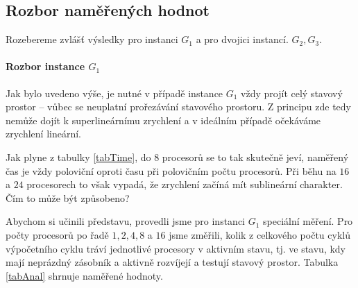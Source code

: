 \documentclass[12pt]{article}
\theoremstyle{definition}
\begin{document}
\subsection{Rozbor naměřených hodnot}
Rozebereme zvlášť výsledky pro instanci $G_1$ a pro dvojici instancí. $G_2, G_3$.
\paragraph{Rozbor instance $G_1$}\mbox{}\newline
Jak bylo uvedeno výše, je nutné v případě instance $G_1$ vždy projít celý stavový prostor -- vůbec se
neuplatní prořezávání stavového prostoru. Z principu zde tedy nemůže dojít k superlineárnímu zrychlení a v ideálním
případě očekáváme zrychlení lineární.

Jak plyne z tabulky \ref{tabTime}, do $8$ procesorů se to tak skutečně jeví, naměřený čas je vždy poloviční oproti času
při polovičním počtu procesorů. Při běhu na $16$ a $24$ procesorech to však vypadá, že zrychlení začíná mít sublineární charakter.
Čím to může být způsobeno?

Abychom si učinili představu, provedli jsme pro instanci $G_1$ speciální měření. Pro počty procesorů po řadě $1,2,4,8$ a $16$ jsme změřili,
kolik z celkového počtu cyklů výpočetního cyklu tráví jednotlivé procesory v aktivním stavu, tj. ve stavu, kdy mají neprázdný zásobník
a aktivně rozvíjejí a testují stavový prostor. Tabulka \ref{tabAnal} shrnuje naměřené hodnoty.
\end{document}
